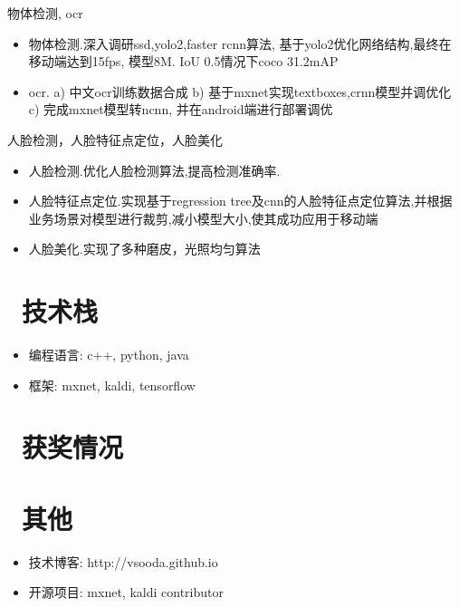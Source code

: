 \documentclass{resume}
\begin{document}
物体检测, ocr
\begin{itemize}
  \item 物体检测.深入调研ssd,yolo2,faster rcnn算法, 基于yolo2优化网络结构,最终在移动端达到15fps, 模型8M. IoU 0.5情况下coco 31.2mAP
  \item ocr. a) 中文ocr训练数据合成 b) 基于mxnet实现textboxes,crnn模型并调优化 c) 完成mxnet模型转ncnn, 并在android端进行部署调优
\end{itemize}

人脸检测，人脸特征点定位，人脸美化
\begin{itemize}
  \item 人脸检测.优化人脸检测算法,提高检测准确率.
  \item 人脸特征点定位.实现基于regression tree及cnn的人脸特征点定位算法,并根据业务场景对模型进行裁剪,减小模型大小,使其成功应用于移动端
  \item 人脸美化.实现了多种磨皮，光照均匀算法
\end{itemize}

\section{\faCogs\ 技术栈}
\begin{itemize}[parsep=0.5ex]
  \item 编程语言: c++, python, java
  \item 框架: mxnet, kaldi, tensorflow
\end{itemize}

\section{\faHeartO\ 获奖情况}


\section{\faPencilSquare\ 其他}
\begin{itemize}[parsep=0.5ex]
  \item 技术博客: http://vsooda.github.io
  \item 开源项目: mxnet, kaldi contributor
\end{itemize}
\end{document}
